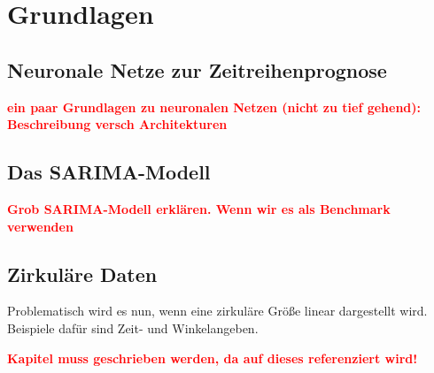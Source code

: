 \documentclass[
12pt, %
toc=listofnumbered, %
toc=chapterentrydotfill, %
numbers=noenddot, %
captions=tableheading, %
bibliography=numbered
]{scrreprt}
\let\Oldsection\section
\renewcommand{\section}{\FloatBarrier\Oldsection}
\newcommand{\highlight}[1]{\textbf{\textcolor{red}{#1}}}
\begin{document}
\chapter{Grundlagen}

\section{Neuronale Netze zur Zeitreihenprognose}
\highlight{ein paar Grundlagen zu neuronalen Netzen (nicht zu tief gehend): 
Beschreibung versch Architekturen}

\section{Das SARIMA-Modell}
\highlight{Grob SARIMA-Modell erklären. Wenn wir es als Benchmark verwenden}

\section{Zirkuläre Daten}\label{section:circ_data}

Problematisch wird es nun, wenn eine zirkuläre Größe linear dargestellt wird. Beispiele dafür sind Zeit- und Winkelangeben. 

\highlight{Kapitel muss geschrieben werden, da auf dieses referenziert wird!}
\end{document}

